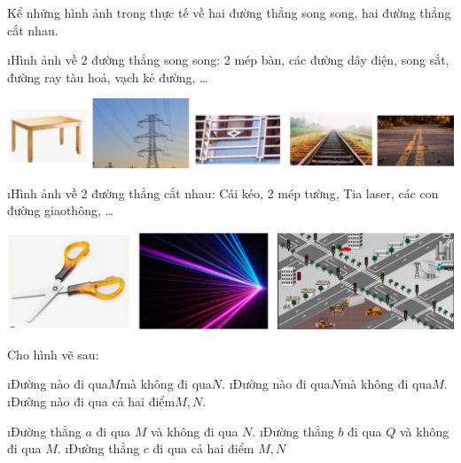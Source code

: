 \begin{bt}
	Kể những hình ảnh trong thực tế về hai đường thẳng song song, hai đường thẳng cắt nhau.
	\begin{loigiaichuong28}
		\begin{enumerate}[--,leftmargin=*]
			\i Hình ảnh về 2 đường thẳng song song: 2 mép bàn, các đường dây điện, song sắt, đường ray tàu hoả, vạch kẻ đường, \ldots
			\begin{center}
				\includegraphics[width=0.75\linewidth]{image029}
			\end{center}
		\i Hình ảnh về 2 đường thẳng cắt nhau: Cái kéo, 2 mép tường, Tia laser, các con đường giao\linebreak thông, \ldots
		\begin{center}
			\includegraphics[width=0.75\linewidth]{image030}
		\end{center}
		\end{enumerate}
	\end{loigiaichuong28}
\end{bt}
\begin{bt} %
	Cho hình vẽ sau: 
	\begin{enumerate}[a),leftmargin=*]
		\i Đường nào đi qua$M$mà không đi qua$N$.
		\i Đường nào đi qua$N$mà không đi qua$M$.
		\i Đường nào đi qua cả hai điểm$M,N$.
	\end{enumerate}
	\begin{loigiaichuong28}
		\begin{enumerate}[a),leftmargin=*]
			\i Đường thẳng  $a$ đi qua $M$ và không đi qua $N$. 
			\i Đường thẳng $b$ đi qua $Q$  và không đi qua $M$. 
			\i Đường thẳng $c$ đi qua cả hai điểm $M,N$
		\end{enumerate}
	\end{loigiaichuong28}
\end{bt}
